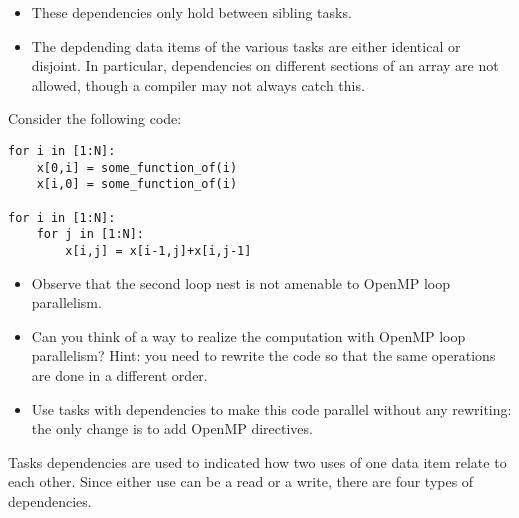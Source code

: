 \begin{itemize}
\item
  These dependencies only hold between sibling tasks.
\item The depdending data items of the various tasks
  are either identical or disjoint.
  In particular, dependencies on different sections of an array
  are not allowed, though a compiler may not always catch this.
\end{itemize}

\begin{exercise}
Consider the following code:
\begin{lstlisting}
for i in [1:N]:
    x[0,i] = some_function_of(i)
    x[i,0] = some_function_of(i)

for i in [1:N]:
    for j in [1:N]:
        x[i,j] = x[i-1,j]+x[i,j-1]
\end{lstlisting}
\begin{itemize}
\item Observe that the second loop nest is not amenable to OpenMP loop
  parallelism.
\item Can you think of a way to realize the computation with OpenMP
  loop parallelism? Hint: you need to rewrite the code so that the
  same operations are done in a different order.
\item Use tasks with dependencies to make this code parallel without
  any rewriting: the only change is to add OpenMP directives.
\end{itemize}
\end{exercise}

Tasks dependencies are used to indicated how two uses of one data item
relate to each other. Since either use can be a read or a write,
there are four types of dependencies.

